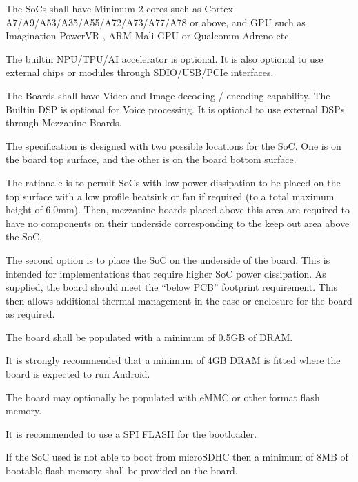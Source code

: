\documentclass[a4paper,10pt,oneside,english]{sphinxmanual}
\begin{document}
\sphinxAtStartPar
{}

\sphinxAtStartPar
The SoCs shall have Minimum 2 cores such as Cortex A7/A9/A53/A35/A55/A72/A73/A77/A78 or above, and  GPU such as Imagination PowerVR , ARM Mali GPU or Qualcomm Adreno etc.

\sphinxAtStartPar
The built\sphinxhyphen{}in  NPU/TPU/AI accelerator is optional. It is also optional to use external chips or modules through SDIO/USB/PCIe interfaces.

\sphinxAtStartPar
The Boards shall have Video and Image decoding / encoding capability. The Built\sphinxhyphen{}in DSP is optional for Voice processing. It is optional to use external DSPs through Mezzanine Boards.

\sphinxAtStartPar
{}

\sphinxAtStartPar
The specification is designed with two possible locations for the SoC. One is on the board top surface, and the other is on the board bottom surface.

\sphinxAtStartPar
The rationale is to permit SoCs with low power dissipation to be placed on the top surface with a low profile heatsink or fan if required (to a total maximum height of 6.0mm). Then, mezzanine boards placed above this area are required to have no components on their underside corresponding to the keep out area above the SoC.

\sphinxAtStartPar
The second option is to place the SoC on the underside of the board. This is intended for implementations that require higher SoC power dissipation. As supplied, the board should meet the “below PCB” footprint requirement. This then allows additional thermal management in the case or enclosure for the board as required.

\sphinxAtStartPar
{}

\sphinxAtStartPar
The board shall be populated with a minimum of 0.5GB of DRAM.

\sphinxAtStartPar
It is strongly recommended that a minimum of 4GB DRAM is fitted where the board is expected to run Android.

\sphinxAtStartPar
{}

\sphinxAtStartPar
The board may optionally be populated with eMMC or other format flash memory.

\sphinxAtStartPar
It is recommended to use a SPI FLASH for  the bootloader.

\sphinxAtStartPar
If the SoC used is not able to boot from microSDHC then a minimum of 8MB of bootable flash memory shall be provided on the board.
\end{document}
